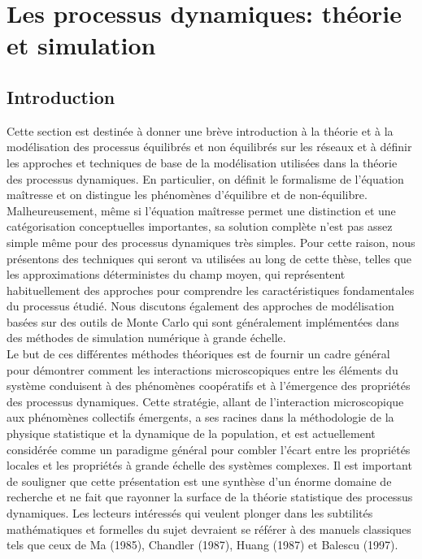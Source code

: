\section{Les processus dynamiques: théorie et simulation}

\subsection{Introduction}

Cette section est destinée à  donner une brève introduction à la théorie et à la modélisation des processus équilibrés et non équilibrés sur les réseaux et à définir les approches et techniques de base de la modélisation utilisées dans la théorie des processus dynamiques. En particulier, on définit le formalisme de l'équation maîtresse et on distingue les phénomènes d'équilibre et de non-équilibre. Malheureusement, même si l'équation maîtresse permet une distinction et une catégorisation conceptuelles importantes, sa solution complète n'est pas assez simple même pour des processus dynamiques très simples. Pour cette raison, nous présentons des techniques qui seront va utilisées au long de cette thèse, telles que les approximations déterministes du champ moyen, qui représentent habituellement des approches pour comprendre les caractéristiques fondamentales du processus étudié. Nous discutons également des approches de modélisation basées sur des outils de Monte Carlo qui sont généralement implémentées dans des méthodes de simulation numérique à grande échelle.\\ 

Le but de ces différentes méthodes théoriques est de fournir un cadre général pour démontrer comment les interactions microscopiques entre les éléments du système conduisent à des phénomènes coopératifs et à l'émergence des propriétés des processus dynamiques. Cette stratégie, allant de l'interaction microscopique aux phénomènes collectifs émergents, a ses racines dans la méthodologie de la physique statistique et la dynamique de la population, et est actuellement considérée comme un paradigme général pour combler l'écart entre les propriétés locales et les propriétés à grande échelle des systèmes complexes. Il est important de souligner que cette présentation est une synthèse d'un énorme domaine de recherche et ne fait que rayonner la surface de la théorie statistique des processus dynamiques. Les lecteurs intéressés qui veulent plonger dans les subtilités mathématiques et formelles du sujet devraient se référer à des manuels classiques tels que ceux de Ma (1985), Chandler (1987), Huang (1987) et Balescu (1997).
